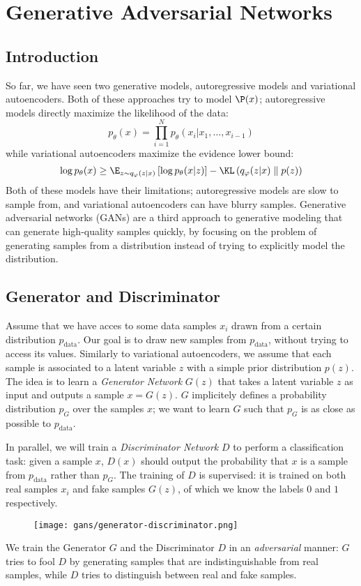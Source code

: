 \section{Generative Adversarial Networks}
\subsection{Introduction}
So far, we have seen two generative models, autoregressive models and variational autoencoders. Both of these approaches try to model $\P(x)$; autoregressive models directly maximize the likelihood of the data:
\begin{equation*}
    p_\theta(x) = \prod_{i=1}^N p_\theta(x_i|x_1, \dots, x_{i-1})
\end{equation*}
while variational autoencoders maximize the evidence lower bound:
\begin{equation*}
    \log p_\theta(x) \geq \E_{z\sim q_\varphi(z|x)}\left[\log p_\theta(x|z)\right] - \KL\left(q_\varphi(z|x)\parallel p(z)\right)
\end{equation*}
Both of these models have their limitations; autoregressive models are slow to sample from, and variational autoencoders can have blurry samples. Generative adversarial networks (GANs) are a third approach to generative modeling that can generate high-quality samples quickly, by focusing on the problem of generating samples from a distribution instead of trying to explicitly model the distribution.

\subsection{Generator and Discriminator}
Assume that we have acces to some data samples $x_i$ drawn from a certain distribution $p_{\text{data}}$. Our goal is to draw new samples from $p_{\text{data}}$, without trying to access its values. Similarly to variational autoencoders, we assume that each sample is associated to a latent variable $z$ with a simple prior distribution $p(z)$. The idea is to learn a \emph{Generator Network} $G(z)$ that takes a latent variable $z$ as input and outputs a sample $x = G(z)$. $G$ implicitely defines a probability distribution $p_G$ over the samples $x$; we want to learn $G$ such that $p_G$ is as close as possible to $p_{\text{data}}$.

In parallel, we will train a \emph{Discriminator Network} $D$ to perform a classification task: given a sample $x$, $D(x)$ should output the probability that $x$ is a sample from $p_{\text{data}}$ rather than $p_G$. The training of $D$ is supervised: it is trained on both real samples $x_i$ and fake samples $G(z)$, of which we know the labels $0$ and $1$ respectively.
\begin{figure}[H]
    \centering
    \texttt{[image: gans/generator-discriminator.png]}
\end{figure}
We train the Generator $G$ and the Discriminator $D$ in an \emph{adversarial} manner: $G$ tries to fool $D$ by generating samples that are indistinguishable from real samples, while $D$ tries to distinguish between real and fake samples.

